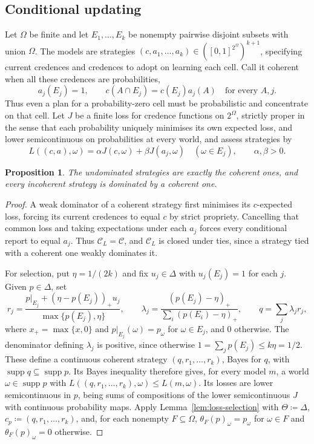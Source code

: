 \documentclass[11pt]{article}
\newtheorem{proposition}[theorem]{Proposition}
\theoremstyle{definition}
\theoremstyle{remark}
\newcommand{\C}{\mathcal C}
\newcommand{\supp}{\operatorname{supp}}
\begin{document}
\subsection{Conditional updating}
Let $\Omega$ be finite and let $E_1,\ldots,E_k$ be nonempty pairwise disjoint subsets with union $\Omega$. The models are strategies $(c,a_1,\ldots,a_k)\in([0,1]^{2^\Omega})^{k+1}$, specifying current credences and credences to adopt on learning each cell. Call it coherent when all these credences are probabilities,
\[
a_j(E_j)=1,\qquad c(A\cap E_j)=c(E_j)a_j(A)\quad\text{for every }A,j.
\]
Thus even a plan for a probability-zero cell must be probabilistic and concentrate on that cell. Let $J$ be a finite loss for credence functions on $2^\Omega$, strictly proper in the sense that each probability uniquely minimises its own expected loss, and lower semicontinuous on probabilities at every world, and assess strategies by
\[
L((c,a),\omega)=\alpha J(c,\omega)+\beta J(a_j,\omega)
\quad(\omega\in E_j),\qquad \alpha,\beta>0.
\]
\begin{proposition}\label{prop:short-updating}
The undominated strategies are exactly the coherent ones, and every incoherent strategy is dominated by a coherent one.
\end{proposition}
\begin{proof}
A weak dominator of a coherent strategy first minimises its $c$-expected loss, forcing its current credences to equal $c$ by strict propriety. Cancelling that common loss and taking expectations under each $a_j$ forces every conditional report to equal $a_j$. Thus $\C_L=\C$, and $\C_L$ is closed under ties, since a strategy tied with a coherent one weakly dominates it.

For selection, put $\eta=1/(2k)$ and fix $u_j\in\Delta$ with $u_j(E_j)=1$ for each $j$. Given $p\in\Delta$, set
\[
r_j=\frac{p|_{E_j}+(\eta-p(E_j))_+u_j}{\max\{p(E_j),\eta\}},\qquad
\lambda_j=\frac{(p(E_j)-\eta)_+}{\sum_i(p(E_i)-\eta)_+},\qquad
q=\sum_j\lambda_jr_j,
\]
where $x_+=\max\{x,0\}$ and $p|_{E_j}(\omega)=p_\omega$ for $\omega\in E_j$, and $0$ otherwise. The denominator defining $\lambda_j$ is positive, since otherwise $1=\sum_jp(E_j)\le k\eta=1/2$. These define a continuous coherent strategy $(q,r_1,\ldots,r_k)$, Bayes for $q$, with $\supp q\subseteq\supp p$. Its Bayes inequality therefore gives, for every model $m$, a world $\omega\in\supp p$ with $L((q,r_1,\ldots,r_k),\omega)\le L(m,\omega)$. Its losses are lower semicontinuous in $p$, being sums of compositions of the lower semicontinuous $J$ with continuous probability maps. Apply Lemma~\ref{lem:loss-selection} with $\Theta\coloneqq\Delta$, $c_p\coloneqq(q,r_1,\ldots,r_k)$, and, for each nonempty $F\subseteq\Omega$, $\theta_F(p)_\omega=p_\omega$ for $\omega\in F$ and $\theta_F(p)_\omega=0$ otherwise.
\end{proof}
\end{document}
